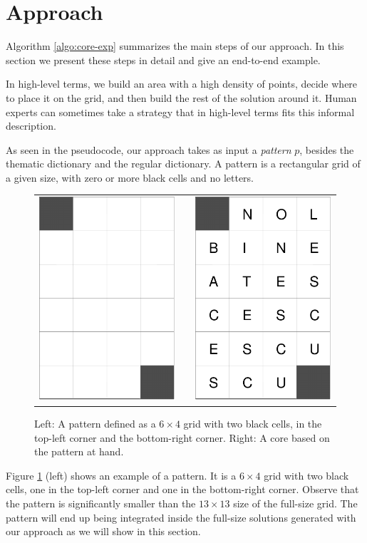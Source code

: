 \section{Approach}

Algorithm \ref{algo:core-exp} summarizes the main steps of our approach.
In this section we present these steps in detail and give an end-to-end example.

In high-level terms, we build an area with a high density of points, decide where to place it on the grid,
and then build the rest of the solution around it.
Human experts can sometimes take a strategy that in high-level terms fits this informal description.

As seen in the pseudocode, our approach takes as input a \emph{pattern} $p$, besides
the thematic dictionary and the regular dictionary.
A {pattern} is a rectangular grid of a given size, with zero or more black cells and no letters.

\begin{figure}
\centering
\begin{tabular}{ccc}
\includegraphics[width=.15\textwidth]{_plots/6x4-puzzle.pdf} & &
\includegraphics[width=.15\textwidth]{_plots/core-6x4-puzzle.pdf}
\end{tabular}
\caption{Left: A pattern defined as a $6 \times 4$ grid with two black cells, in the top-left corner and the bottom-right corner. Right: A core based on the pattern at hand.}
\label{fig:pattern}
\end{figure}

Figure \ref{fig:pattern} (left) shows an example of a pattern. It is a $6 \times 4$ grid with two black cells, one in the top-left corner and one in the bottom-right corner.
Observe that the pattern is significantly smaller than the $13 \times 13$ size of the full-size grid.
The pattern will end up being integrated inside the full-size solutions generated with our approach
as we will show in this section.

